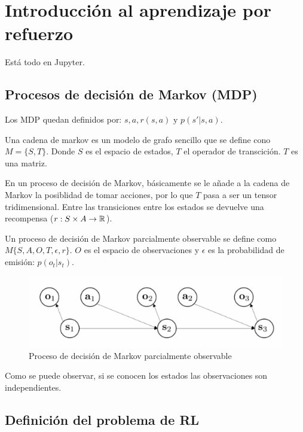 \chapter{Introducción al aprendizaje por refuerzo}


Está todo en Jupyter.


\section{Procesos de decisión de Markov (MDP)}%
\label{sec:procesos_de_decisión_de_markov_mdp_}

Los MDP quedan definidos por: $s, a, r(s, a) \textrm{ y } p(s'|s,a)$.

Una cadena de markov es un modelo de grafo sencillo que se define cono $M=\{S,T\}$. Donde
$S$ es el espacio de estados, $T$ el operador de transcición. $T$ es una matriz.

En un proceso de decisión de Markov, básicamente se le añade a la cadena de Markov la posiblidad
de tomar acciones, por lo que $T$ pasa a ser un tensor tridimensional. Entre las transiciones
entre los estados se devuelve una recompensa ($r:S\times A \rightarrow \mathbb{R}$).

Un proceso de decisión de Markov parcialmente observable se define como
$M\{S,A,O,T,\epsilon, r\}$. $O$ es el espacio de observaciones y $\epsilon$ es la probabilidad
de emisión: $p(o_t | s_t)$.

\begin{figure}[htpb]
	\centering
	\includegraphics[width=0.6\linewidth]{figures/2020-06-12-185644_530x148_scrot.png}
	\caption{Proceso de decisión de Markov parcialmente observable}
\end{figure}

Como se puede observar, si se conocen los estados las observaciones son independientes.

\section{Definición del problema de RL}%
\label{sec:definición_del_problema_de_rl}

